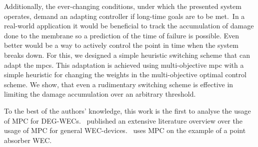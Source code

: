 Additionally, the ever-changing conditions, under which the presented system operates, demand an adapting controller if long-time goals are to be met.\ In a real-world application it would be beneficial to track the accumulation of damage done to the membrane so a prediction of the time of failure is possible. Even better would be a way to actively control the point in time when the system breaks down. For this, we designed a simple heuristic switching scheme that can adapt the \acp{mpc}. 
This adaptation is achieved using multi-objective \ac{mpc} with a simple heuristic for changing the weights in the multi-objective optimal control scheme.
We show, that even a rudimentary switching scheme is effective in limiting the damage accumulation over an arbitrary threshold.

To the best of the authors' knowledge, this work is the first to analyse the usage of MPC for DEG-WECs.\ \cite{Faedo2017} published an extensive literature overview over the usage of MPC for general WEC-devices.\ \cite{Brekken2011} uses MPC on the example of a point absorber WEC. 